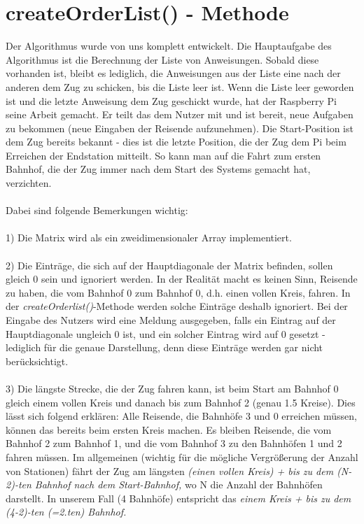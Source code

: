 \section{createOrderList() - Methode}
Der Algorithmus wurde von uns komplett entwickelt. Die Hauptaufgabe des Algorithmus ist die Berechnung der Liste von Anweisungen. Sobald diese vorhanden ist, bleibt es lediglich, die Anweisungen aus der Liste eine nach der anderen dem Zug zu schicken, bis die Liste leer ist. Wenn die Liste leer geworden ist und die letzte Anweisung dem Zug geschickt wurde, hat der Raspberry Pi seine Arbeit gemacht. Er teilt das dem Nutzer mit und ist bereit, neue Aufgaben zu bekommen (neue Eingaben der Reisende aufzunehmen). Die Start-Position ist dem Zug bereits bekannt - dies ist die letzte Position, die der Zug dem Pi beim Erreichen der Endstation mitteilt. So kann man auf die Fahrt zum ersten Bahnhof, die der Zug immer nach dem Start des Systems gemacht hat, verzichten.\\
\\
Dabei sind folgende Bemerkungen wichtig:\\
\\
1) Die Matrix wird als ein zweidimensionaler Array implementiert.\\
\\
2) Die Einträge, die sich auf der Hauptdiagonale der Matrix befinden, sollen gleich 0 sein und ignoriert werden. In der Realität macht es keinen Sinn, Reisende zu haben, die vom Bahnhof 0 zum Bahnhof 0, d.h. einen vollen Kreis, fahren. In der \textit{createOrderlist()}-Methode werden solche Einträge deshalb ignoriert. Bei der Eingabe des Nutzers wird eine Meldung ausgegeben, falls ein Eintrag auf der Hauptdiagonale ungleich 0 ist, und ein solcher Eintrag wird auf 0 gesetzt - lediglich für die genaue Darstellung, denn diese Einträge werden gar nicht berücksichtigt.\\
\\
3) Die längste Strecke, die der Zug fahren kann, ist beim Start am Bahnhof 0 gleich einem vollen Kreis und danach bis zum Bahnhof 2 (genau 1.5 Kreise). Dies lässt sich folgend erklären: Alle Reisende, die Bahnhöfe 3 und 0 erreichen müssen, können das bereits beim ersten Kreis machen. Es bleiben Reisende, die vom Bahnhof 2 zum Bahnhof 1, und die vom Bahnhof 3 zu den Bahnhöfen 1 und 2 fahren müssen. Im allgemeinen (wichtig für die mögliche Vergrößerung der Anzahl von Stationen) fährt der Zug am längsten \textit{(einen vollen Kreis) + bis zu dem (N-2)-ten Bahnhof nach dem Start-Bahnhof,} wo N die Anzahl der Bahnhöfen darstellt. In unserem Fall (4 Bahnhöfe) entspricht das \textit{einem Kreis + bis zu dem (4-2)-ten (=2.ten) Bahnhof.}\\
